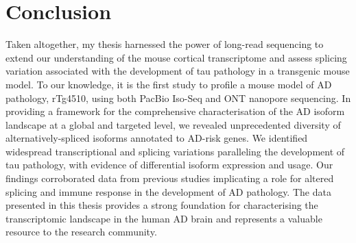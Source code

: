\section{Conclusion}
Taken altogether, my thesis harnessed the power of long-read sequencing to extend our understanding of the mouse cortical transcriptome and assess splicing variation associated with the development of tau pathology in a transgenic mouse model. To our knowledge, it is the first study to profile a mouse model of AD pathology, rTg4510, using both PacBio Iso-Seq and ONT nanopore sequencing. In providing a framework for the comprehensive characterisation of the AD isoform landscape at a global and targeted level, we revealed unprecedented diversity of alternatively-spliced isoforms annotated to AD-risk genes. We identified widespread transcriptional and splicing variations paralleling the development of tau pathology, with evidence of differential isoform expression and usage. Our findings corroborated data from previous studies implicating a role for altered splicing and immune response in the development of AD pathology. The data presented in this thesis provides a strong foundation for characterising the transcriptomic landscape in the human AD brain and represents a valuable resource to the research community.   